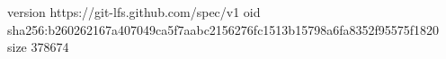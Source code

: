 version https://git-lfs.github.com/spec/v1
oid sha256:b260262167a407049ca5f7aabc2156276fc1513b15798a6fa8352f95575f1820
size 378674
